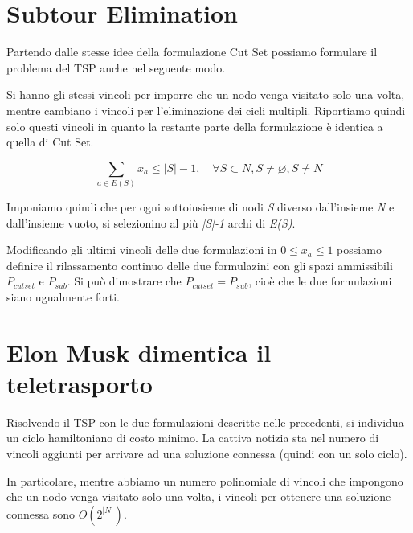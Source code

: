 \section{Subtour Elimination}
Partendo dalle stesse idee della formulazione Cut Set possiamo formulare il problema del TSP anche nel seguente modo.

Si hanno gli stessi vincoli per imporre che un nodo venga visitato solo una volta, mentre cambiano i vincoli per l'eliminazione dei cicli multipli. Riportiamo quindi solo questi vincoli in quanto la restante parte della formulazione è identica a quella di Cut Set.

\[
\sum_{a \in E(S)} x_a \leq |S| - 1, \quad \forall S \subset N, S \ne \varnothing, S \ne N
\]

Imponiamo quindi che per ogni sottoinsieme di nodi \textit{S} diverso dall'insieme \textit{N} e dall'insieme vuoto, si selezionino al più \textit{|S|-1} archi di \textit{E(S)}.


Modificando gli ultimi vincoli delle due formulazioni in \begin{math}0 \leq x_{a} \leq 1\end{math} possiamo definire il rilassamento continuo delle due formulazini con gli spazi ammissibili \begin{math}P_{cutset}\end{math} e \begin{math}P_{sub}\end{math}.
Si può dimostrare che \begin{math}P_{cutset}=P_{sub}\end{math}, cioè che le due formulazioni siano ugualmente forti.

\section{Elon Musk dimentica il teletrasporto}\label{elon_teletrasporto}

Risolvendo il TSP con le due formulazioni descritte nelle precedenti, si individua un ciclo hamiltoniano di costo minimo. La cattiva notizia sta nel numero di vincoli aggiunti per arrivare ad una soluzione connessa (quindi con un solo ciclo). 

In particolare, mentre abbiamo un numero polinomiale di  vincoli che impongono che un nodo venga visitato solo una volta, i vincoli per ottenere una soluzione connessa sono \begin{math}O(2^{|N|})\end{math}.

